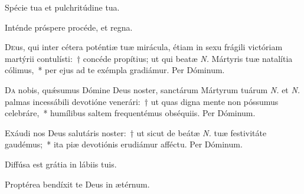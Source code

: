 \documentclass[vesperale_romanum.tex]{subfiles}
\begin{document}


\newpage
\altertonus


\vel



\vv Spécie tua et pulchritúdine tua. \tpalleluia

\rr Inténde próspere procéde, et regna. \tpalleluia



\lettrine{D}{e}us, qui inter cétera poténtiæ tuæ mirácula, étiam in sexu frágili vi\-ctóriam martýrii contulísti:~† concéde propítius; ut qui beatæ \textit{N.} Mártyris tuæ natalítia cólimus,~* per ejus ad te exémpla gradiámur. Per Dóminum.


\lettrine{D}{a} nobis, quǽsumus Dómine Deus noster, san\-ctárum Mártyrum tuárum \textit{N.} et \textit{N.} palmas incessábili devotióne venerári:~† ut quas digna mente non póssumus celebráre,~* humílibus saltem frequentémus obséquiis. Per Dóminum.


\lettrine{E}{x}áudi nos Deus salutáris noster:~† ut sicut de beátæ \textit{N.} tuæ festivitáte gaudémus;~* ita piæ devotiónis erudiámur affé\-ctu.
Per Dóminum.


\omniapraeter %

\vv Diffúsa est grátia in lábiis tuis. \tpalleluia

\rr Proptérea bendíxit te Deus in ætérnum. \tpalleluia

\end{document}
